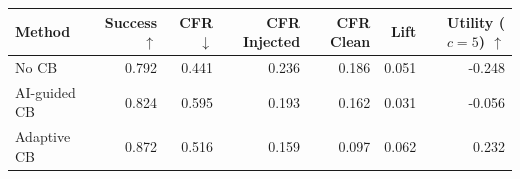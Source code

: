 \begin{tabular}{lrrrrrr}
\toprule
Method & Success $\uparrow$ & CFR $\downarrow$ & CFR Injected & CFR Clean & Lift & Utility ($c=5$) $\uparrow$ \\
\midrule
No CB & 0.792 & 0.441 & 0.236 & 0.186 & 0.051 & -0.248 \\
AI-guided CB & 0.824 & 0.595 & 0.193 & 0.162 & 0.031 & -0.056 \\
Adaptive CB & 0.872 & 0.516 & 0.159 & 0.097 & 0.062 & 0.232 \\
\bottomrule
\end{tabular}
